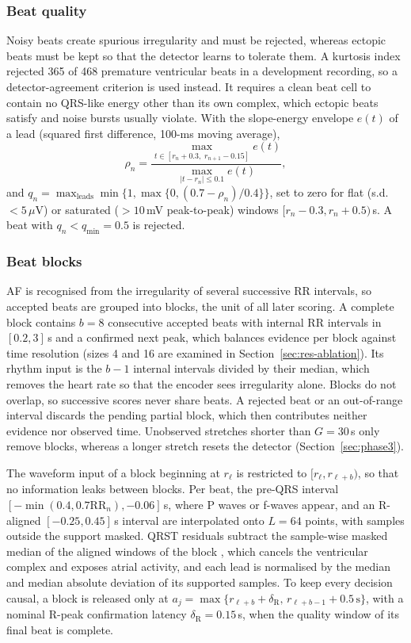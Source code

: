 \documentclass[preprint,12pt]{elsarticle}
\newcommand{\1}{\mathbf{1}}
\begin{document}
\subsubsection{Beat quality}
Noisy beats create spurious irregularity and must be rejected, whereas ectopic beats must be kept so that the detector learns to tolerate them. A kurtosis index \cite{li2008sqi} rejected 365 of 468 premature ventricular beats in a development recording, so a detector-agreement criterion \cite{li2008sqi,behar2013sqi} is used instead. It requires a clean beat cell to contain no QRS-like energy other than its own complex, which ectopic beats satisfy and noise bursts usually violate. With the slope-energy envelope $e(t)$ of a lead (squared first difference, 100-ms moving average),
\begin{equation}
\rho_n=\frac{\max_{t\in[r_n+0.3,\;r_{n+1}-0.15]}e(t)}{\max_{|t-r_n|\le0.1}e(t)},
\label{eq:sqi}
\end{equation}
and $q_n=\max_{\text{leads}}\min\{1,\max\{0,(0.7-\rho_n)/0.4\}\}$, set to zero for flat (s.d.\ $<5\,\mu$V) or saturated ($>10$\,mV peak-to-peak) windows $[r_n-0.3,r_n+0.5)$\,s. A beat with $q_n<q_{\min}=0.5$ is rejected.

\subsubsection{Beat blocks}
AF is recognised from the irregularity of several successive RR intervals, so accepted beats are grouped into blocks, the unit of all later scoring. A complete block contains $b=8$ consecutive accepted beats with internal RR intervals in $[0.2,3]$\,s and a confirmed next peak, which balances evidence per block against time resolution (sizes 4 and 16 are examined in Section~\ref{sec:res-ablation}). Its rhythm input is the $b-1$ internal intervals divided by their median, which removes the heart rate so that the encoder sees irregularity alone. Blocks do not overlap, so successive scores never share beats. A rejected beat or an out-of-range interval discards the pending partial block, which then contributes neither evidence nor observed time. Unobserved stretches shorter than $G=30$\,s only remove blocks, whereas a longer stretch resets the detector (Section~\ref{sec:phase3}).

The waveform input of a block beginning at $r_\ell$ is restricted to $[r_\ell,r_{\ell+b})$, so that no information leaks between blocks. Per beat, the pre-QRS interval $[-\min(0.4,0.7\mathrm{RR}_n),-0.06]$\,s, where P waves or f-waves appear, and an R-aligned $[-0.25,0.45]$\,s interval are interpolated onto $L=64$ points, with samples outside the support masked. QRST residuals subtract the sample-wise masked median of the aligned windows of the block \cite{stridh2001qrst}, which cancels the ventricular complex and exposes atrial activity, and each lead is normalised by the median and median absolute deviation of its supported samples. To keep every decision causal, a block is released only at $a_j=\max\{r_{\ell+b}+\delta_{\mathrm R},\,r_{\ell+b-1}+0.5\,\mathrm{s}\}$, with a nominal R-peak confirmation latency $\delta_{\mathrm R}=0.15$\,s, when the quality window of its final beat is complete.
\end{document}
